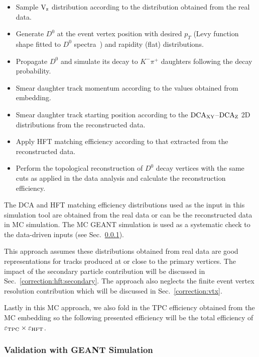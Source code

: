 \documentclass[%
 reprint,	
showpacs,
 amsmath,amssymb,
 aps,
 prc,
]{revtex4-1}
\begin{document}
 \begin{itemize} 
\item Sample $\textup{V}_\textup{z}$ distribution according to the distribution obtained from the real data.
\item Generate $D^0$ at the event vertex position with desired $p_T$ (Levy function shape fitted to $D^0$ spectra~\cite{Star_D_RAA}) and rapidity (flat) distributions.
\item Propagate $D^0$ and simulate its decay to $K^-\pi^+$ daughters following the decay probability.
\item Smear daughter track momentum according to the values obtained from embedding.
\item Smear daughter track starting position according to the $\textup{DCA}_{\textup{XY}}$--$\textup{DCA}_\textup{Z}$ 2D distributions from the reconstructed data.
\item Apply HFT matching efficiency according to that extracted from the reconstructed data.
\item Perform the topological reconstruction of $D^0$ decay vertices with the same cuts as applied in the data analysis and calculate the reconstruction efficiency.
 \end{itemize} 

The DCA and HFT matching efficiency distributions used as the input in this simulation tool are obtained from the real data or can be the reconstructed data in MC simulation. The MC GEANT simulation is used as a systematic check to the data-driven inputs (see Sec.~\ref{correction:hft:validation}). 

This approach assumes these distributions obtained from real data are good representations for tracks produced at or close to the primary vertices. The impact of the secondary particle contribution will be discussed in Sec.~\ref{correction:hft:secondary}. The approach also neglects the finite event vertex resolution contribution which will be discussed in Sec.~\ref{correction:vtx}.

Lastly in this MC approach, we also fold in the TPC efficiency obtained from the MC embedding so the following presented efficiency will be the total efficiency of $\varepsilon_{\rm TPC}\times\varepsilon_{\rm HFT}$.

\subsubsection{Validation with GEANT Simulation}
\label{correction:hft:validation}
\end{document}

